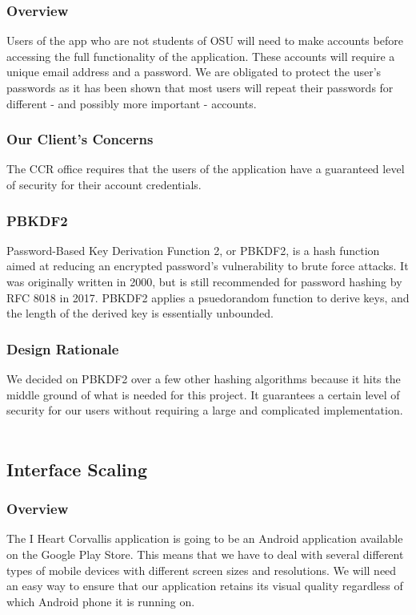\documentclass[draftclsnofoot, onecolumn, 10pt, compsoc]{IEEEtran}
\begin{document}
			\subsubsection{Overview}
				Users of the app who are not students of OSU will need to make accounts before accessing the full functionality of the application. These accounts will require a unique email address and a password. We are obligated to protect the user's passwords as it has been shown that most users will repeat their passwords for different - and possibly more important - accounts.
			\subsubsection{Our Client's Concerns}
				The CCR office requires that the users of the application have a guaranteed level of security for their account credentials.
			\subsubsection{PBKDF2}
				Password-Based Key Derivation Function 2, or PBKDF2, is a hash function aimed at reducing an encrypted password's vulnerability to brute force attacks. It was originally written in 2000, but is still recommended for password hashing by RFC 8018 in 2017. PBKDF2 applies a psuedorandom function to derive keys, and the length of the derived key is essentially unbounded.
				~\cite{PBKDF2}
				~\cite{PBKDF2_More}
			\subsubsection{Design Rationale}
				We decided on PBKDF2 over a few other hashing algorithms because it hits the middle ground of what is needed for this project. It guarantees a certain level of security for our users without requiring a large and complicated implementation.
				~\cite{PBKDF2}

		\subsection{Interface Scaling}
			\subsubsection{Overview}
				The I Heart Corvallis application is going to be an Android application available on the Google Play Store. This means that we have to deal with several different types of mobile devices with different screen sizes and resolutions. We will need an easy way to ensure that our application retains its visual quality regardless of which Android phone it is running on.
\end{document}
